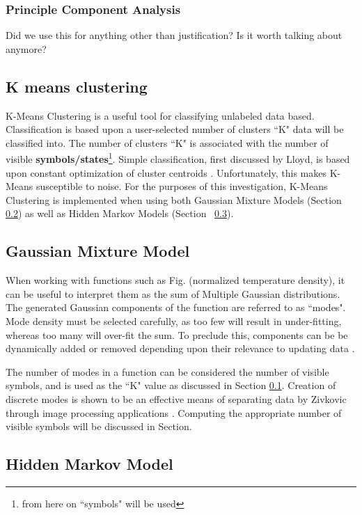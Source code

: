 \documentclass[twocolumn,10pt]{article}
\begin{document}
\subsubsection{Principle Component Analysis}
Did we use this for anything other than justification? Is it worth talking about anymore?

\subsection{K means clustering}\label{sec:kmeans}
K-Means Clustering is a useful tool for classifying unlabeled data based. Classification is based upon a user-selected number of clusters ``K" data will be classified into. The number of clusters ``K" is associated with the number of visible \textbf{symbols/states}\footnote{from here on ``symbols" will be used}. Simple classification, first discussed by Lloyd, is based upon constant optimization of cluster centroids \cite{pcm} . Unfortunately, this makes K-Means susceptible to noise. For the purposes of this investigation, K-Means Clustering is implemented when using both Gaussian Mixture Models (Section \ref{sec:gmm}) as well as Hidden Markov Models (Section ~\ref{sec:hmm}).

\subsection{Gaussian Mixture Model}\label{sec:gmm}
When working with functions such as Fig. (normalized temperature density), it can be useful to interpret them as the sum of Multiple Gaussian distributions. The generated Gaussian components of the function are referred to as ``modes". Mode density must be selected carefully, as too few will result in under-fitting, whereas too many will over-fit the sum. To preclude this, components can be be dynamically added or removed depending upon their relevance to updating data \cite{GMM}.

The number of modes in a function can be considered the number of visible symbols, and is used as the ``K" value as discussed in Section \ref{sec:kmeans}. Creation of discrete modes is shown to be an effective means of separating data by Zivkovic through image processing applications \cite{GMM}.
Computing the appropriate number of visible symbols will be discussed in Section.

\subsection{Hidden Markov Model}\label{sec:hmm}





\end{document}
